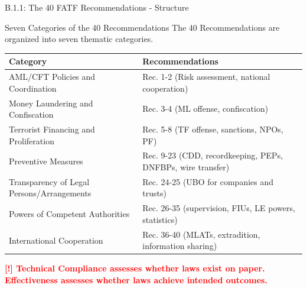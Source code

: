 \documentclass[11pt,a4paper]{beamer}
\newcommand{\redflag}[1]{\textcolor{red}{\textbf{[!] #1}}}
\begin{document}
	\begin{frame}{B.1.1: The 40 FATF Recommendations - Structure}
		\begin{block}{Seven Categories of the 40 Recommendations}
			The 40 Recommendations are organized into seven thematic categories.
		\end{block}
		\begin{tabular}{p{}|p{}}
			\hline
			\rowcolor{lightgray}
			\textbf{Category} & \textbf{Recommendations} \\
			\hline
			AML/CFT Policies and Coordination & Rec. 1-2 (Risk assessment, national cooperation) \\
			\hline
			Money Laundering and Confiscation & Rec. 3-4 (ML offense, confiscation) \\
			\hline
			Terrorist Financing and Proliferation & Rec. 5-8 (TF offense, sanctions, NPOs, PF) \\
			\hline
			Preventive Measures & Rec. 9-23 (CDD, recordkeeping, PEPs, DNFBPs, wire transfer) \\
			\hline
			Transparency of Legal Persons/Arrangements & Rec. 24-25 (UBO for companies and trusts) \\
			\hline
			Powers of Competent Authorities & Rec. 26-35 (supervision, FIUs, LE powers, statistics) \\
			\hline
			International Cooperation & Rec. 36-40 (MLATs, extradition, information sharing) \\
			\hline
		\end{tabular}
		\vspace{0.2cm}
		\redflag{Technical Compliance assesses whether laws exist on paper. Effectiveness assesses whether laws achieve intended outcomes.}
	\end{frame}
	
\end{document}
